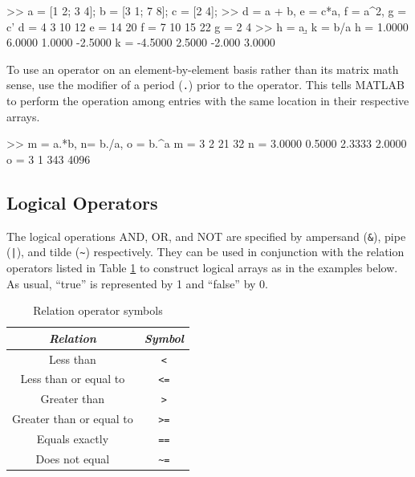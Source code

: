 \begin{codex}
>> a = [1 2; 3 4]; b = [3 1; 7 8]; c = [2 4];
>> d = a + b, e = c*a, f = a^2, g = c'
d =
    4   3
    10  12
e =
    14  20
f =
    7   10
    15  22
g =
    2
    4
>> h = a\b, k = b/a
h =
    1.0000  6.0000
    1.0000  -2.5000
k =
    -4.5000 2.5000
    -2.000  3.0000
\end{codex}

\par
To use an operator on an element-by-element basis rather than its matrix math sense, use the modifier of a period (\verb=.=) prior to the operator.  This tells MATLAB to perform the operation among entries with the same location in their respective arrays.

\begin{codex}
>> m = a.*b, n= b./a, o = b.^a
m =
    3   2
    21  32
n =
    3.0000  0.5000
    2.3333  2.0000
o =
    3   1
    343 4096
\end{codex}

\subsection{Logical Operators} \label{app.oper.logic}
The logical operations AND, OR, and NOT are specified by ampersand (\verb=&=), pipe (\verb=|=), and tilde (\verb=~=) respectively.  They can be used in conjunction with the relation operators listed in Table \nolinebreak[3] \ref{tab.relationoperations} to construct logical arrays as in the examples below.  As usual, ``true'' is represented by 1 and ``false'' by 0.

\begin{table}[bht]
\centering
\begin{tabular}{c|c}
    \textit{Relation}       &   \textit{Symbol} \\ \hline \hline
    Less than               &   \verb#<# \\
    Less than or equal to   &   \verb#<=# \\
    Greater than            &   \verb#># \\
    Greater than or equal to&   \verb#>=# \\
    Equals exactly          &   \verb#==# \\
    Does not equal          &   \verb#~=#
\end{tabular}
\caption[Relation Operations]{\footnotesize
        Relation operator symbols
        \label{tab.relationoperations}
        }
\end{table}

